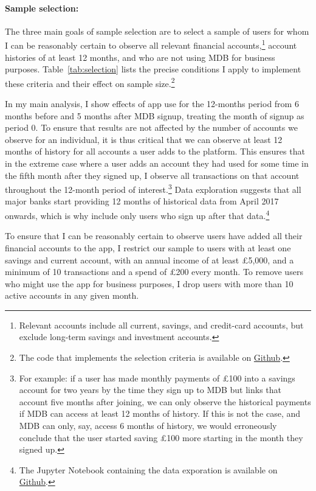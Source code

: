 \paragraph{Sample selection:}%
\label{par:sample_selection_}

The three main goals of sample selection are to select a sample of users for
whom I can be reasonably certain to observe all relevant financial
accounts,\footnote{Relevant accounts include all current, savings, and
credit-card accounts, but exclude long-term savings and investment accounts.}
account histories of at least 12 months, and who are not using MDB for business
purposes. Table~\ref{tab:selection} lists the precise conditions I apply to
implement these criteria and their effect on sample size.\footnote{The code
that implements the selection criteria is available on
\href{https://github.com/fabiangunzinger/mdb_eval/blob/main/src/data/selectors.py}{Github}.}

In my main analysis, I show effects of app use for the 12-months period from 6
months before and 5 months after MDB signup, treating the month of signup as
period 0. To ensure that results are not affected by the number of accounts we
observe for an individual, it is thus critical that we can observe at least 12
months of history for all accounts a user adds to the platform. This ensures
that in the extreme case where a user adds an account they had used for some
time in the fifth month after they signed up, I observe all transactions on
that account throughout the 12-month period of interest.\footnote{For example:
    if a user has made monthly payments of \pounds100 into a savings account
    for two years by the time they sign up to MDB but links that account five
    months after joining, we can only observe the historical payments if MDB
    can access at least 12 months of history. If this is not the case, and MDB
    can only, say, access 6 months of history, we would erroneously conclude
that the user started saving \pounds100 more starting in the month they signed
up.} Data exploration suggests that all major banks start providing 12 months
of historical data from April 2017 onwards, which is why include only users who
sign up after that data.\footnote{The Jupyter Notebook containing the data
exporation is available on
\href{https://github.com/fabiangunzinger/mdb_eval/blob/371493bd78870cab7a303edb70687287e5bca4a9/notebooks/available_account_history.ipynb}{Github}.}

To ensure that I can be reasonably certain to observe users have added all
their financial accounts to the app, I restrict our sample to users with at
least one savings and current account, with an annual income of at least
\pounds5,000, and a minimum of 10 transactions and a spend of \pounds200 every
month. To remove users who might use the app for business purposes, I drop
users with more than 10 active accounts in any given month.


